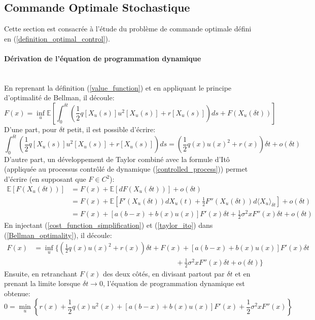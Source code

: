 \subsection{Commande Optimale Stochastique}
Cette section est consacrée à l'étude du problème de commande optimale défini en (\ref{definition_optimal_control}).
\paragraph{Dérivation de l'équation de programmation dynamique}\phantom{}\\
En reprenant la définition (\ref{value_function}) et en appliquant le principe d'optimalité de Bellman, il découle:
\begin{equation}\label{Bellman_optimality}
        F(x) = \inf_u\mathds{E}\left[\int_0^{\delta t}\left(\frac{1}{2}q\left[X_u(s)\right]u^2\left[X_u(s)\right]+r\left[X_u(s)\right]\right)ds+F(X_u(\delta t))\right]
\end{equation}
D'une part, pour $\delta t$ petit, il est possible d'écrire:
\begin{equation}\label{cost_function_simplification}
    \int_0^{\delta t}\left(\frac{1}{2}q\left[X_u(s)\right]u^2\left[X_u(s)\right]+r\left[X_u(s)\right]\right)ds=\left(\frac{1}{2}q(x){u(x)}^2+r(x)\right)\delta t+o(\delta t)
\end{equation}
D'autre part, un développement de Taylor combiné avec la formule d'Itô~\cite{ito1944} (appliquée au processus contrôlé de dynamique (\ref{controlled_process})) permet d'écrire (en supposant que $F\in C^2$):
\begin{equation}\label{taylor_ito}
    \begin{aligned}
        \mathds{E}[F(X_u(\delta t))]&=F(x)+\mathds{E}[dF(X_u(\delta t))]+o(\delta t)\\
        &=F(x)+\mathds{E}\left[F'(X_u(\delta t))dX_u(t)+\frac{1}{2}F''(X_u(\delta t))d\langle X_u\rangle_{\delta t} \right]+o(\delta t)\\
        &=F(x)+\left[a(b-x)+b(x)u(x)\right]F'(x)\delta t+\frac{1}{2}\sigma^2xF''(x)\delta t+o(\delta t)
    \end{aligned}
\end{equation}
En injectant (\ref{cost_function_simplification}) et (\ref{taylor_ito}) dans (\ref{Bellman_optimality}), il découle:
\begin{equation}\label{initial_minimisation problem}
    \begin{aligned}
        F(x)&=\inf_u\Bigg\{\left(\frac{1}{2}q(x){u(x)}^2+r(x)\right)\delta t+F(x)+\left[a(b-x)+b(x)u(x)\right]F'(x)\delta t\\&\quad\quad\quad\quad\quad\quad\quad\quad\quad\quad\quad\quad\quad\quad\quad\quad\quad\quad\quad\quad+\frac{1}{2}\sigma^2xF''(x)\delta t+o(\delta t)\Bigg\}
    \end{aligned}
\end{equation}
Ensuite, en retranchant $F(x)$ des deux côtés, en divisant partout par $\delta t$ et en prenant la limite lorsque $\delta t\to0$, l'équation de programmation dynamique est obtenue:
\begin{equation}\label{minimisation_problem}
    0=\min_u\left\{r(x)+\frac{1}{2}q(x)u^2(x)+[a(b-x)+b(x)u(x)]F'(x)+\frac{1}{2}\sigma^2xF''(x)\right\}
\end{equation}
